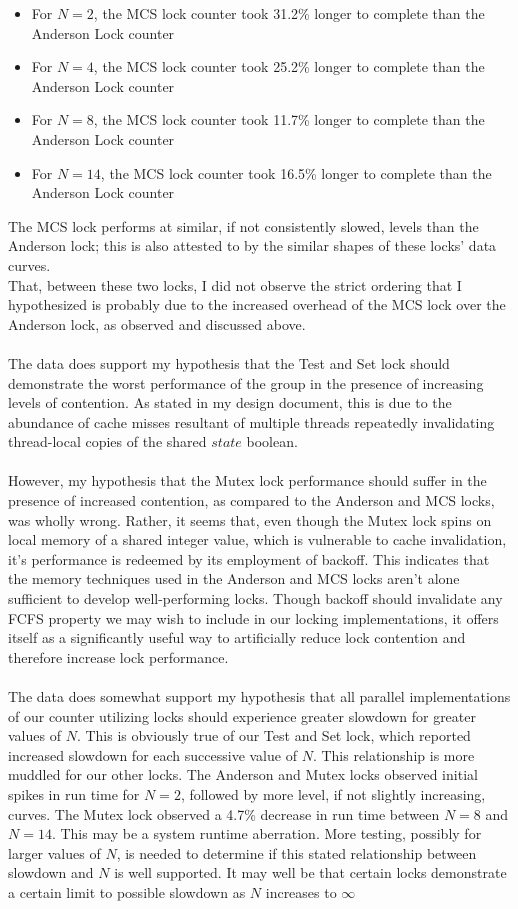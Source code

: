 \documentclass[]{article}
\begin{document}
\begin{itemize}
	\item For $N = 2$, the MCS lock counter took 31.2\% longer to complete than the Anderson Lock counter
	\item For $N = 4$, the MCS lock counter took 25.2\% longer to complete than the Anderson Lock counter
	\item For $N = 8$, the MCS lock counter took 11.7\% longer to complete than the Anderson Lock counter
	\item For $N = 14$, the MCS lock counter took 16.5\% longer to complete than the Anderson Lock counter
\end{itemize}
The MCS lock performs at similar, if not consistently slowed, levels than the Anderson lock; this is also attested to by the similar shapes of these locks' data curves.
\\
That, between these two locks, I did not observe the strict ordering that I hypothesized is probably due to the increased overhead of the MCS lock over the Anderson lock, as observed and discussed above.
\\\\
The data does support my hypothesis that the Test and Set lock should demonstrate the worst performance of the group in the presence of increasing levels of contention. As stated in my design document, this is due to the abundance of cache misses resultant of multiple threads repeatedly invalidating thread-local copies of the shared $state$ boolean.
\\\\
However, my hypothesis that the Mutex lock performance should suffer in the presence of increased contention, as compared to the Anderson and MCS locks, was wholly wrong. Rather, it seems that, even though the Mutex lock spins on local memory of a shared integer value, which is vulnerable to cache invalidation, it's performance is redeemed by its employment of backoff. This indicates that the memory techniques used in the Anderson and MCS locks aren't alone sufficient to develop well-performing locks. Though backoff should invalidate any FCFS property we may wish to include in our locking implementations, it offers itself as a significantly useful way to artificially reduce lock contention and therefore increase lock performance.
\\\\
The data does somewhat support my hypothesis that all parallel implementations of our counter utilizing locks should experience greater slowdown for greater values of $N$. This is obviously true of our Test and Set lock, which reported increased slowdown for each successive value of $N$. This relationship is more muddled for our other locks. The Anderson and Mutex locks observed initial spikes in run time for $N = 2$, followed by more level, if not slightly increasing, curves. The Mutex lock observed a 4.7\% decrease in run time between $N = 8$ and $N = 14$. This may be a system runtime aberration. More testing, possibly for larger values of $N$, is needed to determine if this stated relationship between slowdown and $N$ is well supported. It may well be that certain locks demonstrate a certain limit to possible slowdown as $N$ increases to $\infty$
\end{document}
